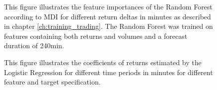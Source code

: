 \begin{figure}[H]
    \captionsetup{format=plain}
    \caption{ 
            This figure illustrates the feature importances of the Random Forest according to MDI \cite{louppe2015variableImportance}
            for different return deltas in minutes as described in chapter \ref{ch:training_trading}. 
            The Random Forest was trained on features containing both returns and volumes and a forecast duration of 240min.
        }
    \label{fig:forest_return_feature_importance_with_volume_240min}
\end{figure}

\begin{figure}[H]
    \captionsetup{format=plain}
    \caption{ 
            This figure illustrates the coefficients of returns estimated by the Logistic Regression
            for different time periods in minutes for different feature and target specification.
        }
    \label{fig:logistic_return_coefficients}
\end{figure}

\pagebreak
